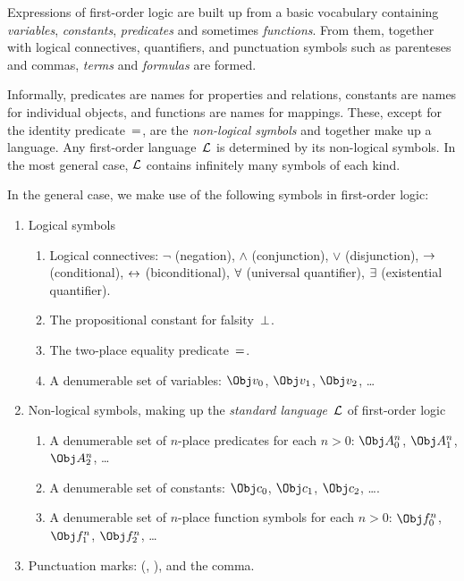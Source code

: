 \documentclass[open-logic-section]{subfiles}
\begin{document}

\begin{wordy}
Expressions of first-order logic are built up from a basic vocabulary
containing \emph{variables}, \emph{constants}, \emph{predicates} and
sometimes \emph{functions}.  From them, together with logical
connectives, quantifiers, and punctuation symbols such as parenteses
and commas, \emph{terms} and \emph{formulas} are formed.  

Informally, predicates are names for properties and relations,
constants are names for individual objects, and functions are names
for mappings.  These, except for the identity predicate~$\eq$, are the
\emph{non-logical symbols} and together make up a language.  Any
first-order language~$\mathcal L$ is determined by its non-logical
symbols.  In the most general case, $\mathcal L$ contains infinitely
many symbols of each kind.
\end{wordy}

In the general case, we make use of the following symbols in
first-order logic:

\begin{enumerate}
\item Logical symbols
\begin{enumerate}
\item Logical connectives: $\lnot$ (negation), $\land$ (conjunction),
  $\lor$ (disjunction), $\to$ (conditional), $\leftrightarrow$ (biconditional),
  $\lforall$ (universal quantifier), $\lexists$ (existential
  quantifier).
\item The propositional constant for falsity~$\bot$.
\item The two-place equality predicate~$\eq$.
\item A denumerable set of variables: $\Obj v_0$, $\Obj v_1$, $\Obj
  v_2$, \dots
\end{enumerate}
\item Non-logical symbols, making up the \emph{standard
  language}~$\mathcal L$ of first-order logic
\begin{enumerate}
\item A denumerable set of $n$-place predicates for each $n>0$: $\Obj
  A^n_0$, $\Obj A^n_1$, $\Obj A^n_2$, \dots
\item A denumerable set of constants: $\Obj c_0$, $\Obj c_1$, $\Obj
  c_2$, \dots.
\item A denumerable set of $n$-place function symbols for each $n>0$:
  $\Obj f^n_0$, $\Obj f^n_1$, $\Obj f^n_2$, \dots
\end{enumerate}
\item Punctuation marks: (, ), and the comma.
\end{enumerate}
\end{document}
